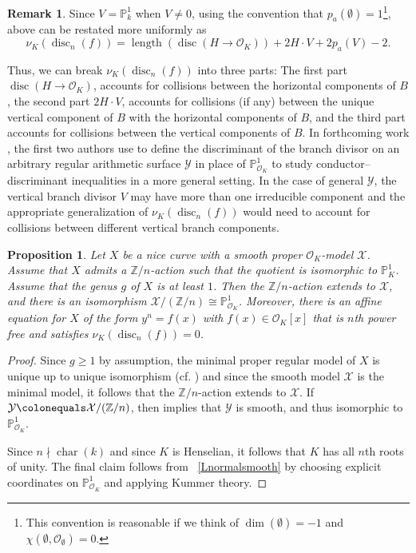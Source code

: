 \documentclass[12pt]{amsart}
\numberwithin{equation}{section}
\newtheorem{prop}[equation]{Proposition}
\theoremstyle{definition}
\newtheorem{remark}[equation]{Remark}
\newcommand{\mc}[1]{\mathcal{#1}}
\newcommand{\ints}{\mathbb Z}
\newcommand{\proj}{\mathbb P}
\DeclareMathOperator{\len}{length}
\DeclareMathOperator{\disc}{disc}
\DeclareMathOperator{\cha}{char}
\begin{document}
\begin{remark}\label{R:geodisc} Since $V = \mathbb{P}^1_k$ when $V \neq 0$, using the convention that $p_a(\emptyset) = 1$\footnote{This convention is reasonable if we think of $\dim(\emptyset) = -1$ and
   $\chi(\emptyset, \mc{O}_{\emptyset}) = 0$.},  above can be restated more uniformly as
   \begin{equation}\label{Ediscgen} \nu_K(\disc_n(f)) = \len (\disc(H \to
 \mc{O}_K)) + 2H \cdot V + 2p_a(V) - 2. \end{equation}
  

Thus, we can break $\nu_K(\disc_n(f))$ into three parts: The first part $\disc(H
\to \mc{O}_K)$, accounts for collisions between the
 horizontal components of $B$, the second part
 $2H \cdot V$, accounts for collisions (if any) between
 the unique vertical component of $B$ with the
 horizontal components of $B$, and the third part accounts for collisions between the vertical components of $B$.
In forthcoming work \cite{OSRelative}, the first two authors use  to define the discriminant of the branch divisor on an arbitrary regular arithmetic surface $\mc{Y}$ in place of $\proj^1_{\mc{O}_K}$ to study conductor--discriminant inequalities in a more general setting. In the case of general $\mc{Y}$, the vertical branch divisor $V$ may have more than one irreducible component  and the appropriate generalization of $\nu_K(\disc_n(f))$ would need to account for collisions between different vertical branch components.
\end{remark}

\begin{prop}\label{Pquotsmoothmodel}
Let $X$ be a nice curve with a smooth proper $\mc{O}_K$-model $\mc{X}$. Assume that $X$ admits a $\ints/n$-action such that the quotient is isomorphic to $\proj^1_K$. Assume that the genus $g$ of $X$ is at least $1$. Then the $\ints/n$-action extends to $\mc{X}$, and there is an isomorphism $\mc{X}/(\ints/n) \cong \proj^1_{\mc{O}_K}$. Moreover, there is an affine equation for $X$ of the form $y^n=f(x)$ with $f(x) \in \mc{O}_K[x]$ that is $n$th power free and satisfies $\nu_K(\disc_n(f)) = 0$. 
\end{prop}
\begin{proof}
Since $g \geq 1$ by assumption, the minimal proper regular model of
$X$ is unique up to unique isomorphism (cf. \cite[Definition~3.31,
Proposition~3.36~(2)]{Liubook}) and since the smooth model $\mc{X}$ is
the minimal model, it follows that the $\ints/n$-action extends to
$\mc{X}$.  If $\mc{Y} \colonequals \mc{X}/(\ints/n)$, then \cite[Proposition~10.3.48(a)]{Liubook} implies that
$\mc{Y}$ is
smooth, and thus isomorphic to $\proj^1_{\mc{O}_K}$. 

Since $n \nmid \cha(k)$ and since $K$ is Henselian, it follows that $K$ has all $n$th roots of unity. The final claim follows from ~\ref{Lnormalsmooth} by choosing explicit coordinates on $\proj^1_{\mc{O}_K}$ and applying Kummer theory. 
\end{proof}
\end{document}
